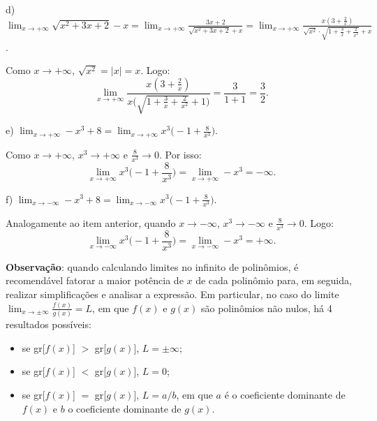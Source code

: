 \documentclass{article}
\begin{document}
{\begin{newpage}
\par
\vspace{0.3cm}
d) $\displaystyle{\lim_{x\to +\infty } \sqrt{x^2 + 3x + 2} - x =\lim_{x\to +\infty } \frac{3x+2}{\sqrt{x^2 + 3x + 2} + x} = \lim_{x\to +\infty } \frac{x(3+\frac{2}{x})}{\sqrt{x{^2}} \cdot \sqrt{1 + \frac{3}{x} +\frac{2}{x^2}} + x}}$.
\par Como $x\rightarrow +\infty $, $\sqrt{x^2} = |x| = x$. Logo:
$$\displaystyle{\lim_{x\to +\infty }} \frac{x(3+\frac{2}{x})}{x\Big(\sqrt{1 + \frac{3}{x} +\frac{2}{x^2}} + 1\Big)} = \frac{3}{1+1} = \frac{3}{2}.$$
\par
\vspace{0.3cm}
e) $\displaystyle{\lim_{x\to +\infty } -x^3 + 8 = \lim_{x\to +\infty } x^{3}\Big(-1 + \frac{8}{x^3}\Big)}$.
\par
\vspace{0.2cm}
Como $x\rightarrow +\infty $, $x^{3}\rightarrow +\infty $ e $\displaystyle{\frac{8}{x^3}} \rightarrow 0$. Por isso:
$$\displaystyle{\lim_{x\to +\infty }} x^{3}\Big(-1 + \frac{8}{x^3}\Big) = \displaystyle{\lim_{x\to +\infty }} -x^3 = -\infty .$$
\par
\vspace{0.3cm}
f) $\displaystyle{\lim_{x\to -\infty } -x^3 + 8 = \lim_{x\to -\infty } x^{3}\Big(-1 + \frac{8}{x^3}\Big)}$.
\par
\vspace{0.2cm}
Analogamente ao item anterior, quando $x\rightarrow -\infty $, $x^{3} \rightarrow -\infty$ e $\displaystyle{\frac{8}{x^3}} \rightarrow 0$. Logo:
$$\lim_{x\to -\infty } x^{3}\Big(-1 + \frac{8}{x^3}\Big) = \lim_{x\to -\infty } -x^{3} = +\infty .$$
\par
\vspace{0.3cm}
\textbf{Observação}: quando calculando limites no infinito de polinômios, é recomendável fatorar a maior potência de $x$ de cada polinômio para, em seguida, realizar simplificações e analisar a expressão. Em particular, no caso do limite $\displaystyle{\lim_{x\to \pm \infty }} \frac{f(x)}{g(x)} = L$, em que $f(x)$ e $g(x)$ são polinômios não nulos, há 4 resultados possíveis:
\begin{itemize}
\item se gr[$f(x)$] $>$ gr[$g(x)$], $L=\pm \infty $;
\item se gr[$f(x)$] $<$ gr[$g(x)$], $L=0$;
\item se gr[$f(x)$] $=$ gr[$g(x)$], $L=a/b$, em que $a$ é o coeficiente dominante de $f(x)$ e $b$ o coeficiente dominante de $g(x)$.
\end{itemize}
\vspace{0.3cm}

\end{newpage}}
\end{document}
